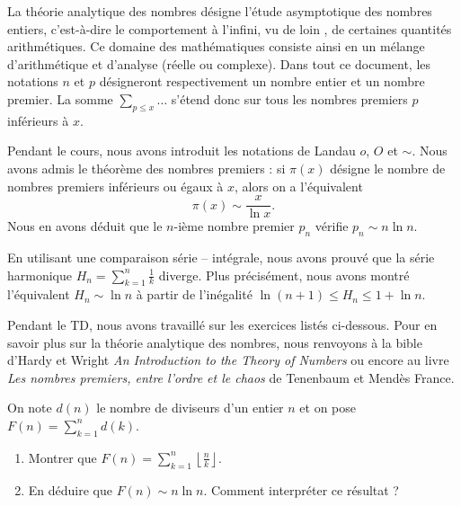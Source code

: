 La théorie analytique des nombres désigne l'étude asymptotique des nombres entiers, c'est-à-dire le comportement à l'infini, \og vu de loin \fg, de certaines quantités arithmétiques. Ce domaine des mathématiques consiste ainsi en un mélange d'arithmétique et d'analyse (réelle ou complexe). Dans tout ce document, les notations $n$ et $p$ désigneront respectivement un nombre entier et un nombre premier. La somme $\sum_{p \leq x} \dots$ s'étend donc sur tous les nombres premiers $p$ inférieurs à $x$.

Pendant le cours, nous avons introduit les notations de Landau $o$, $O$ et $\sim$. Nous avons admis le théorème des nombres premiers : si $\pi(x)$ désigne le nombre de nombres premiers inférieurs ou égaux à $x$, alors on a l'équivalent
	\[\pi(x) \sim \frac{x}{\ln x}.\]
Nous en avons déduit que le $n$-ième nombre premier $p_n$ vérifie $p_n \sim n \ln n$.

En utilisant une comparaison série -- intégrale, nous avons prouvé que la série harmonique $H_n = \sum_{k=1}^{n} \frac{1}{k}$ diverge. Plus précisément, nous avons montré l'équivalent $H_n \sim \ln n$ à partir de l'inégalité $\ln(n+1) \leq H_n \leq 1 + \ln n $.

Pendant le TD, nous avons travaillé sur les exercices listés ci-dessous. Pour en savoir plus sur la théorie analytique des nombres, nous renvoyons à la bible d'Hardy et Wright \textit{An Introduction to the Theory of Numbers} ou encore au livre \textit{Les nombres premiers, entre l'ordre et le chaos} de Tenenbaum et Mendès France. 


\begin{exo}
On note $d(n)$ le nombre de diviseurs d'un entier $n$ et on pose $F(n) = \displaystyle\sum_{k=1}^{n} d(k)$.
\begin{enumerate}
	\item Montrer que $F(n) = \displaystyle\sum_{k=1}^{n} \left\lfloor \frac{n}{k} \right\rfloor$.
	\item En déduire que $F(n) \sim n \ln n$. Comment interpréter ce résultat ?
\end{enumerate}
\end{exo}


